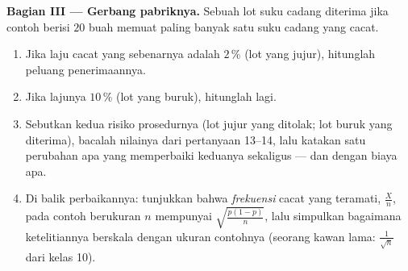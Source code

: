 \begin{problem}
\medskip
\noindent\textbf{Bagian III --- Gerbang pabriknya.}
Sebuah lot suku cadang diterima jika contoh berisi $20$ buah memuat paling banyak
satu suku cadang yang cacat.
\begin{enumerate}[resume]
  \item Jika laju cacat yang sebenarnya adalah $2\,\%$ (lot yang jujur),
        hitunglah peluang penerimaannya.
  \item Jika lajunya $10\,\%$ (lot yang buruk), hitunglah lagi.
  \item Sebutkan kedua risiko prosedurnya (lot jujur yang
        ditolak; lot buruk yang diterima), bacalah nilainya dari
        pertanyaan 13--14, lalu katakan satu perubahan apa yang memperbaiki
        keduanya sekaligus --- dan dengan biaya apa.
  \item Di balik perbaikannya: tunjukkan bahwa \emph{frekuensi} cacat
        yang teramati, $\frac Xn$, pada contoh berukuran $n$ mempunyai
         $\sqrt{\frac{p(1-p)}{n}}$, lalu
        simpulkan bagaimana ketelitiannya berskala dengan ukuran contohnya (seorang
        kawan lama: $\frac{1}{\sqrt n}$ dari kelas 10).
\end{enumerate}


\end{problem}
